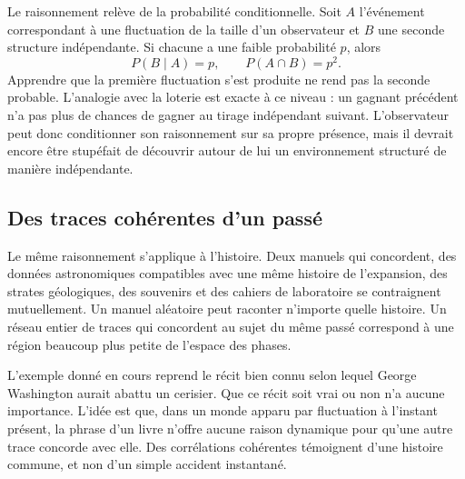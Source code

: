 Le raisonnement relève de la probabilité conditionnelle. Soit \(A\) l’événement correspondant à une fluctuation de la taille d’un observateur et \(B\) une seconde structure indépendante. Si chacune a une faible probabilité \(p\), alors
\begin{equation}
 P(B\mid A)=p,
 \qquad
 P(A\cap B)=p^2.
 \label{eq:sm8-conditional-fluctuations}
\end{equation}
Apprendre que la première fluctuation s’est produite ne rend pas la seconde probable. L’analogie avec la loterie est exacte à ce niveau : un gagnant précédent n’a pas plus de chances de gagner au tirage indépendant suivant. L’observateur peut donc conditionner son raisonnement sur sa propre présence, mais il devrait encore être stupéfait de découvrir autour de lui un environnement structuré de manière indépendante.

\begin{classroomqa}
\end{classroomqa}

\subsection{Des traces cohérentes d’un passé}

Le même raisonnement s’applique à l’histoire. Deux manuels qui concordent, des données astronomiques compatibles avec une même histoire de l’expansion, des strates géologiques, des souvenirs et des cahiers de laboratoire se contraignent mutuellement. Un manuel aléatoire peut raconter n’importe quelle histoire. Un réseau entier de traces qui concordent au sujet du même passé correspond à une région beaucoup plus petite de l’espace des phases.

L’exemple donné en cours reprend le récit bien connu selon lequel George Washington aurait abattu un cerisier. Que ce récit soit vrai ou non n’a aucune importance. L’idée est que, dans un monde apparu par fluctuation à l’instant présent, la phrase d’un livre n’offre aucune raison dynamique pour qu’une autre trace concorde avec elle. Des corrélations cohérentes témoignent d’une histoire commune, et non d’un simple accident instantané.

